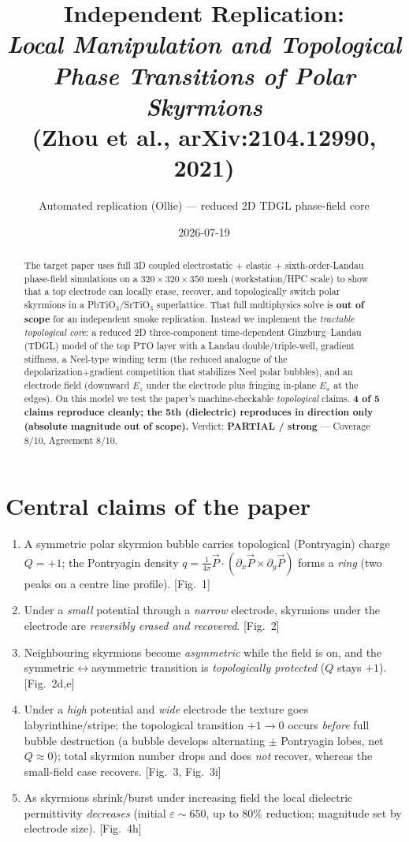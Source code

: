 \documentclass[11pt]{article}
\title{Independent Replication: \\ \emph{Local Manipulation and Topological Phase Transitions of Polar Skyrmions} \\ (Zhou et al., arXiv:2104.12990, 2021)}
\author{Automated replication (Ollie) --- reduced 2D TDGL phase-field core}
\date{2026-07-19}
\begin{document}
\maketitle

\begin{abstract}
The target paper uses full 3D coupled electrostatic + elastic + sixth-order-Landau
phase-field simulations on a $320\times320\times350$ mesh (workstation/HPC scale)
to show that a top electrode can locally erase, recover, and topologically switch
polar skyrmions in a PbTiO$_3$/SrTiO$_3$ superlattice. That full multiphysics
solve is \textbf{out of scope} for an independent smoke replication. Instead we
implement the \emph{tractable topological core}: a reduced 2D three-component
time-dependent Ginzburg--Landau (TDGL) model of the top PTO layer with a Landau
double/triple-well, gradient stiffness, a Neel-type winding term (the reduced
analogue of the depolarization+gradient competition that stabilizes Neel polar
bubbles), and an electrode field (downward $E_z$ under the electrode plus fringing
in-plane $E_x$ at the edges). On this model we test the paper's machine-checkable
\emph{topological} claims. \textbf{4 of 5 claims reproduce cleanly; the 5th
(dielectric) reproduces in direction only (absolute magnitude out of scope).}
Verdict: \textbf{PARTIAL / strong} --- Coverage 8/10, Agreement 8/10.
\end{abstract}

\section{Central claims of the paper}
\begin{enumerate}
\item A symmetric polar skyrmion bubble carries topological (Pontryagin) charge
$Q=+1$; the Pontryagin density $q=\frac{1}{4\pi}\vec P\!\cdot\!(\partial_x\vec P\times\partial_y\vec P)$
forms a \emph{ring} (two peaks on a centre line profile). [Fig.~1]
\item Under a \emph{small} potential through a \emph{narrow} electrode, skyrmions
under the electrode are \emph{reversibly erased and recovered}. [Fig.~2]
\item Neighbouring skyrmions become \emph{asymmetric} while the field is on, and
the symmetric$\leftrightarrow$asymmetric transition is \emph{topologically
protected} ($Q$ stays $+1$). [Fig.~2d,e]
\item Under a \emph{high} potential and \emph{wide} electrode the texture goes
labyrinthine/stripe; the topological transition $+1\!\to\!0$ occurs \emph{before}
full bubble destruction (a bubble develops alternating $\pm$ Pontryagin lobes,
net $Q\approx0$); total skyrmion number drops and does \emph{not} recover, whereas
the small-field case recovers. [Fig.~3, Fig.~3i]
\item As skyrmions shrink/burst under increasing field the local dielectric
permittivity \emph{decreases} (initial $\varepsilon\!\sim\!650$, up to $80\%$
reduction; magnitude set by electrode size). [Fig.~4h]
\end{enumerate}
\end{document}
